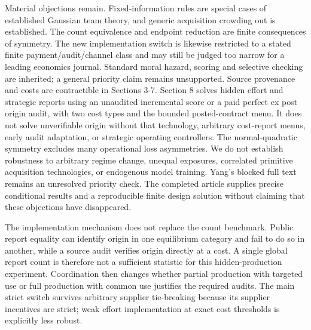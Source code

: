 \documentclass[
  11pt,
]{article}
\begin{document}
Material objections remain. Fixed-information rules are special cases of
established Gaussian team theory, and generic acquisition crowding out
is established. The count equivalence and endpoint reduction are finite
consequences of symmetry. The new implementation switch is likewise
restricted to a stated finite payment/audit/channel class and may still
be judged too narrow for a leading economics journal. Standard moral
hazard, scoring and selective checking are inherited; a general priority
claim remains unsupported. Source provenance and costs are contractible
in Sections 3-7. Section 8 solves hidden effort and strategic reports
using an unaudited incremental score or a paid perfect ex post origin
audit, with two cost types and the bounded posted-contract menu. It does
not solve unverifiable origin without that technology, arbitrary
cost-report menus, early audit adaptation, or strategic operating
controllers. The normal-quadratic symmetry excludes many operational
loss asymmetries. We do not establish robustness to arbitrary regime
change, unequal exposures, correlated primitive acquisition
technologies, or endogenous model training. Yang's blocked full text
remains an unresolved priority check. The completed article supplies
precise conditional results and a reproducible finite design solution
without claiming that these objections have disappeared.

The implementation mechanism does not replace the count benchmark.
Public report equality can identify origin in one equilibrium category
and fail to do so in another, while a source audit verifies origin
directly at a cost. A single global report count is therefore not a
sufficient statistic for this hidden-production experiment. Coordination
then changes whether partial production with targeted use or full
production with common use justifies the required audits. The main
strict switch survives arbitrary supplier tie-breaking because its
supplier incentives are strict; weak effort implementation at exact cost
thresholds is explicitly less robust.
\end{document}
